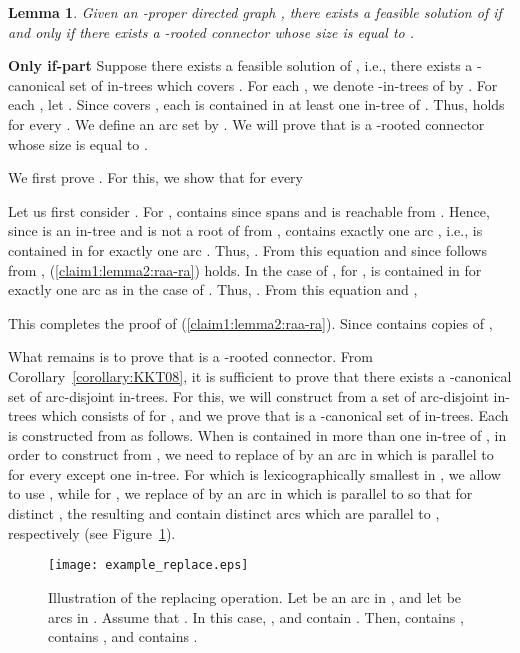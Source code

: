\documentclass[11pt]{article}
\newcounter{ni}
\theoremstyle{plain}
\newtheorem{lemma}[theorem]{Lemma}\newtheorem{corollary}[theorem]{Corollary}\newtheorem{definition}[theorem]{Definition}\newtheorem{proposition}[theorem]{Proposition}\newtheorem{claim}[theorem]{Claim}\newtheorem{fact}[theorem]{Fact}\newtheorem{example}{Example}
\newcommand{\eop}{\hfill \usebox{\ProofSym}}
\newenvironment{proof}{\noindent {\it Proof.}}{\eop\par\vspace{0.3cm}}
\begin{document}
\begin{lemma} \label{lemma2:raa-ra}
Given an -proper
directed graph  , there exists a feasible solution of 
if and only if there exists a -rooted connector whose size is equal to . 
\end{lemma}
\begin{proof}
{\bf Only if-part}
Suppose there exists a feasible solution of , i.e., 
there exists a -canonical set  of in-trees which covers . 
For each , we denote  -in-trees of  
by .
For each , let .
Since  covers , 
each  is contained in at least one in-tree of . 
Thus,  holds for every . 
We define an arc set  by 
. 
We will prove that  is a -rooted 
connector whose size is equal to .  

We first prove . For this, 
we show that for every  

Let us first consider . 
For ,  contains 
since  spans  and  is reachable from . 
Hence, 
since  is an in-tree and  is not a root of  from , 
 contains exactly one arc , i.e., 
 is contained in  for exactly one arc . 
Thus, 
\sum.
From this equation and since  follows from , 
(\ref{claim1:lemma2:raa-ra}) holds. 
In the case of , for , 
 is contained in  for exactly one arc
 as in the case of . Thus, 
\sum. 
From this equation and , 

This completes the proof of (\ref{claim1:lemma2:raa-ra}).
Since  contains  copies of , 


What remains is to prove that  is a -rooted connector. 
From Corollary~\ref{corollary:KKT08}, it is sufficient to  
prove that there exists a -canonical set of arc-disjoint in-trees.
For this, we will construct from  a set  of arc-disjoint in-trees 
which consists of  for ,
and we prove that  is a -canonical set of in-trees.
Each  is constructed from  as follows. 
When  is contained in more than one in-tree of , 
in order to construct  from , 
we need to replace  of  by an arc in  which is parallel to 
for every  except one in-tree.
For  which is lexicographically smallest in , 
we allow  to use , while for , 
we replace  of  by an arc in  which is parallel to  
so that for distinct , 
the resulting  and  contain distinct arcs which are parallel to , 
respectively (see Figure~\ref{example_replace}).

\begin{figure}[h]
\begin{center}
\texttt{[image: example\_replace.eps]}
\end{center}
\caption{\small Illustration of the replacing operation. Let  be an arc in , and 
let  be arcs in . Assume that . In this case, , 
 and  contain . Then,  contains ,  contains , 
and  contains .}
\label{example_replace}
\end{figure}
 

\end{proof}
\end{document}
